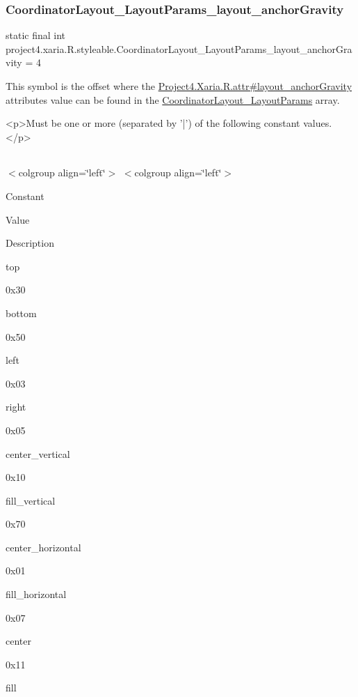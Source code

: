 \subsubsection{\texorpdfstring{Coordinator\+Layout\+\_\+\+Layout\+Params\+\_\+layout\+\_\+anchor\+Gravity}{CoordinatorLayout\_LayoutParams\_layout\_anchorGravity}}
{\footnotesize\ttfamily static final int project4.\+xaria.\+R.\+styleable.\+Coordinator\+Layout\+\_\+\+Layout\+Params\+\_\+layout\+\_\+anchor\+Gravity = 4\hspace{0.3cm}{\ttfamily [static]}}

This symbol is the offset where the \hyperlink{}{Project4.\+Xaria.\+R.\+attr\#layout\+\_\+anchor\+Gravity} attribute\textquotesingle{}s value can be found in the \hyperlink{classproject4_1_1xaria_1_1R_1_1styleable_ad7c97c688ef4dae4ebe89418a84dab5d}{Coordinator\+Layout\+\_\+\+Layout\+Params} array.

\begin{DoxyVerb}      <p>Must be one or more (separated by '|') of the following constant values.</p>
\end{DoxyVerb}
 \tabulinesep=1mm
\begin{longtabu} spread 0pt [c]{*{0}{|X[-1]}|}
\hline
\end{longtabu}
$<$colgroup align=\char`\"{}left\char`\"{}$>$ $<$colgroup align=\char`\"{}left\char`\"{}$>$ 

Constant

Value

Description 

{\ttfamily top}

0x30

{\ttfamily bottom}

0x50

{\ttfamily left}

0x03

{\ttfamily right}

0x05

{\ttfamily center\+\_\+vertical}

0x10

{\ttfamily fill\+\_\+vertical}

0x70

{\ttfamily center\+\_\+horizontal}

0x01

{\ttfamily fill\+\_\+horizontal}

0x07

{\ttfamily center}

0x11

{\ttfamily fill}

